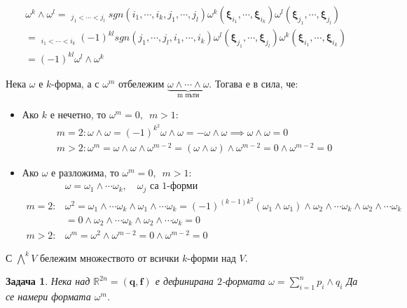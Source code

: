 \documentclass[12pt]{article}
\newtheorem{problem}{Задача}
\newcommand\myxi[0]{\boldsymbol{\xi}}
\begin{document}
\begin{large}
\begin{enumerate}
  \begin{align*}
    &\omega^k \wedge \omega^l=\mathop{\sum_{i_1<\cdots<i_k}}_{j_1<\cdots<j_l} sgn(i_1,\cdots,i_k,j_1, \cdots,j_l)\omega^k(\myxi_{i_1},\cdots,\myxi_{i_k})\omega^l(\myxi_{j_1},\cdots,\myxi_{j_l})\\
    &=\mathop{\sum_{j_1<\cdots<j_l}}_{i_1<\cdots<i_k} (-1)^{kl}sgn(j_1, \cdots,j_l,i_1,\cdots,i_k)\omega^l(\myxi_{j_1},\cdots,\myxi_{j_l})\omega^k(\myxi_{i_1},\cdots,\myxi_{i_k}) \\
    &=(-1)^{kl}\omega^l \wedge \omega^k
  \end{align*}
\end{enumerate}

Нека $\omega$ е $k$-форма, а с $\omega^m$ отбележим $\underbrace{\omega \wedge \cdots \wedge \omega}_{\text{m пъти}}$. Тогава е в сила, че:
\begin{itemize}
  \item Ако $k$ е нечетно, то $\omega^m=0, \enspace m>1$:
  \begin{align*}
    &m=2: \omega \wedge \omega=(-1)^{k^2}\omega \wedge \omega=-\omega \wedge \omega \implies \omega \wedge \omega=0 \\
    &m>2: \omega^m=\omega \wedge \omega \wedge \omega^{m-2}=(\omega \wedge \omega)\wedge \omega^{m-2}=0 \wedge \omega^{m-2}=0
  \end{align*}
  \item Ако $\omega$ е разложима, то $\omega^m=0, \enspace m>1$:
  \begin{align*}
    &\omega=\omega_1 \wedge \cdots \omega_k, \quad  \text{$\omega_j$ са $1$-форми} \\
    m=2: &\omega^2=\omega_1 \wedge \cdots \omega_k \wedge \omega_1 \wedge \cdots \omega_k = (-1)^{(k-1)k^2} (\omega_1 \wedge \omega_1) \wedge \omega_2 \wedge \cdots \omega_k \wedge \omega_2 \wedge \cdots \omega_k \\
    &=0 \wedge \omega_2 \wedge \cdots \omega_k \wedge \omega_2 \wedge \cdots \omega_k = 0 \\
    m>2: &\omega^m=\omega^2 \wedge \omega^{m-2}=0 \wedge \omega^{m-2}=0
  \end{align*}
\end{itemize}

С ${\bigwedge}^k V$ бележим множеството от всички $k$-форми над $V$.

\begin{problem}
  Нека над $\mathbb{R}^{2n}=(\mathbf{q},\mathbf{f})$ е дефинирана $2$-формата $\omega=\sum_{i=1}^n p_i \wedge q_i$ Да се намери формата $\omega^m$.
\end{problem}


\end{large}
\end{document}
